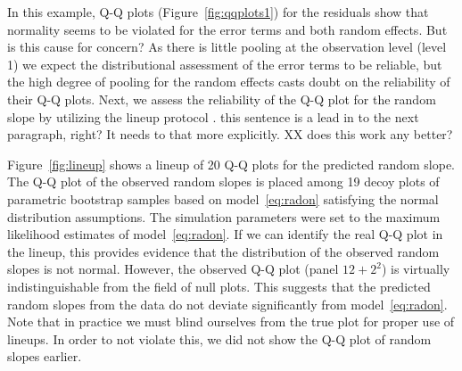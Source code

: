 \documentclass[12pt]{article} %
\newcommand{\hh}[1]{{\color{orange} #1}}
\newcommand{\al}[1]{{\color{red} #1}}
\begin{document}
In this example, Q-Q plots (Figure~\ref{fig:qqplots1}) for the residuals show that normality 
seems to be violated for the error terms and both random effects. But is this cause for concern?
As there is little pooling at the observation level (level 1) we expect the distributional assessment of the error terms to be reliable, but  the high degree of pooling  for the random effects  casts doubt on the reliability of their Q-Q plots. Next, we assess the reliability of the Q-Q plot for the random slope by utilizing the lineup protocol \citep{buja:2009}.
\hh{this sentence is a lead in to the next paragraph, right? It needs to that more explicitly.}
\al{XX does this work any better?}

Figure~\ref{fig:lineup} shows a lineup \citep{buja:2009} of 20 Q-Q plots for the predicted random slope. The Q-Q plot of the observed random slopes is placed among 19 decoy plots of parametric bootstrap samples based on model~\eqref{eq:radon} satisfying the normal distribution assumptions. The simulation parameters were set to the maximum likelihood estimates of model~\eqref{eq:radon}. 
If we can identify the real Q-Q plot in the lineup, this provides evidence that the distribution of the observed random slopes is not normal. However, 
the observed Q-Q plot (panel $12+2^2$) is virtually indistinguishable from the field of null plots. This suggests that the predicted random slopes  from the data do not deviate significantly from model~\eqref{eq:radon}. 
Note that in practice we must blind ourselves from the true plot for proper use of lineups. In order to not violate this, we did not show the Q-Q plot of random slopes earlier.
%
%
\end{document}
